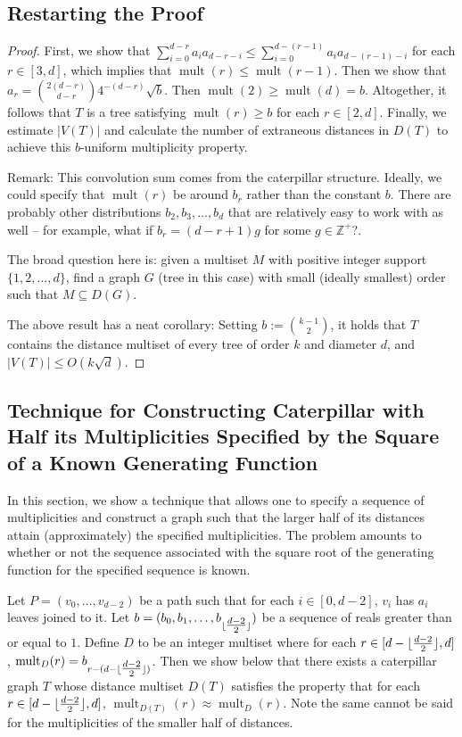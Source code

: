 \documentclass[12]{article}
\newcommand{\Z}{\mathbb{Z}}
\DeclarePairedDelimiter\floor{\lfloor}{\rfloor}
\DeclareMathOperator{\mult}{mult}
\theoremstyle{definition}
\begin{document}
	\subsection{Restarting the Proof}
	
	\begin{proof}
		First, we show that $\sum_{i = 0}^{d-r} a_ia_{d-r-i} \leq \sum_{i=0}^{d-(r-1)}a_ia_{d-(r-1)-i}$ for each $r \in [3,d]$, which implies that $\mult(r) \leq \mult(r-1)$.  Then we show that $a_r = {2(d-r) \choose d-r}4^{-(d-r)}\sqrt{b}$.  Then $\mult(2) \geq \mult(d) = b$.  Altogether, it follows that $T$ is a tree satisfying $\mult(r) \geq b$ for each $r \in [2,d]$.  Finally, we estimate $|V(T)|$ and calculate the number of extraneous distances in $D(T)$ to achieve this $b$-uniform multiplicity property.
		
		Remark:  This convolution sum comes from the caterpillar structure.  Ideally, we could specify that $\mult(r)$ be around $b_r$ rather than the constant $b$.  There are probably other distributions $b_2, b_3, \ldots, b_d$ that are relatively easy to work with as well -- for example, what if $b_r = (d-r+1)g$ for some $g \in \Z^+$?.
		
		The broad question here is: given a multiset $M$ with positive integer support $\{1, 2, \ldots, d\}$, find a graph $G$ (tree in this case) with small (ideally smallest) order such that $M \subseteq D(G)$.
		
		The above result has a neat corollary:  Setting $b := {k-1 \choose 2}$, it holds that $T$ contains the distance multiset of every tree of order $k$ and diameter $d$, and $|V(T)| \leq O(k\sqrt{d})$.
	\end{proof}
	\subsection{Technique for Constructing Caterpillar with Half its Multiplicities Specified by the Square of a Known Generating Function}
		In this section, we show a technique that allows one to specify a sequence of multiplicities and construct a graph such that the larger half of its distances attain (approximately) the specified multiplicities.  The problem amounts to whether or not the sequence associated with the square root of the generating function for the specified sequence is known.
		
		Let $P = (v_0, \ldots, v_{d-2})$ be a path such that for each $i \in [0,d-2]$, $v_i$ has $a_i$ leaves joined to it.  Let $b = (b_0, b_1, \ldots, b_{\floor{\tfrac{d-2}{2}}})$ be a sequence of reals greater than or equal to $1$.  Define $D$ to be an integer multiset where for each $r \in [d-\floor{\tfrac{d-2}{2}}, d]$, $\mult_D(r) = b_{r-(d-\floor{\tfrac{d-2}{2}})}$.  Then we show below that there exists a caterpillar graph $T$ whose distance multiset $D(T)$ satisfies the property that for each $r \in [d-\floor{\tfrac{d-2}{2}}, d]$, $\mult_{D(T)}(r) \approx \mult_D(r)$.  Note the same cannot be said for the multiplicities of the smaller half of distances.
		
\end{document}
